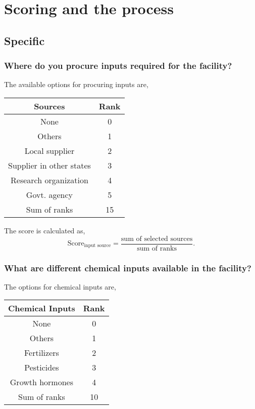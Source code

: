 \documentclass[oneside,twocolumn]{article}
\newcommand{\tsub}[2]{\text{#1}_{\text{#2}}}
\newenvironment{ttable}
               {
                 \begin{center}
                   \begin{tabular}{c|c}
                     \hline
               }
               {
                 \\ \hline
                   \end{tabular}
                 \end{center}
               }
\begin{document}
               \section{Scoring and the process}
               \subsection{Specific}
               \subsubsection{Where do you procure inputs required for the facility?}
               The available options for procuring inputs are,
               \begin{ttable}
                 Sources & Rank \\ \hline
                 None & 0 \\
                 Others & 1 \\
                 Local supplier & 2 \\
                 Supplier in other states & 3 \\
                 Research organization & 4 \\
                 Govt. agency & 5 \\ \hline
                 Sum of ranks & 15
               \end{ttable}

               The score is calculated as,
               \[
               \tsub{Score}{input source} = \dfrac{\text{sum of selected sources}}{\text{sum of ranks}}.
               \]

               \subsubsection{What are different chemical inputs available in the facility?}
               The options for chemical inputs are,
               \begin{ttable}
                 Chemical Inputs & Rank \\ \hline
                 None & 0 \\
                 Others & 1 \\
                 Fertilizers & 2 \\
                 Pesticides & 3 \\
                 Growth hormones & 4 \\ \hline
                 Sum of ranks & 10
               \end{ttable}
\end{document}
